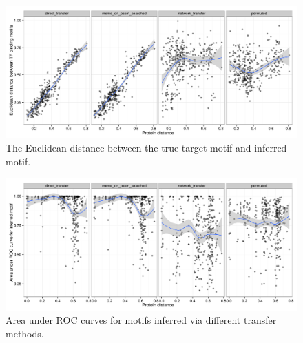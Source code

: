 \documentclass[]{llncs}
\begin{document}
\begin{figure}
  \centering
  \includegraphics[width=\textwidth]{figs/plot2.pdf}
  \caption[ ]{The Euclidean distance between the true target motif and inferred
    motif.}
\label{fig:results_euclidean}
\end{figure}

\begin{figure}
  \centering
  \includegraphics[width=\textwidth]{figs/plot1.pdf}
  \caption{Area under ROC curves for motifs inferred via different transfer
    methods.}
\label{fig:results_ROC}
\end{figure}
\end{document}

